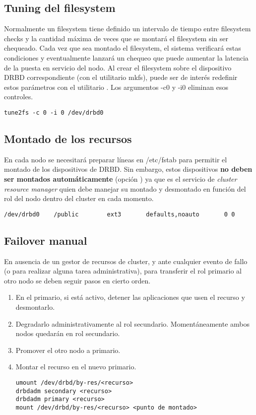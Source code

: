 \subsection{Tuning del filesystem}
Normalmente un filesystem tiene definido un intervalo de tiempo entre filesystem checks y la cantidad máxima de veces que se montará el filesystem sin ser chequeado. Cada vez que sea montado el filesystem, el sistema verificará estas condiciones y eventualmente lanzará un chequeo que puede aumentar la latencia de la puesta en servicio del nodo. Al crear el filesystem sobre el dispositivo DRBD correspondiente (con el utilitario mkfs), puede ser de interés redefinir estos parámetros con el utilitario . Los argumentos -c0 y -i0 eliminan esos controles. 

\begin{lstlisting}
tune2fs -c 0 -i 0 /dev/drbd0
\end{lstlisting}

\subsection{Montado de los recursos}
En cada nodo se necesitará preparar líneas en /etc/fstab para permitir el montado de los dispositivos de DRBD. Sin embargo, estos dispositivos \textbf{no deben ser montados automáticamente} (opción ) ya que es el servicio de \textit{cluster resource manager} quien debe manejar su montado y desmontado en función del rol del nodo dentro del cluster en cada momento.

\begin{lstlisting}
/dev/drbd0    /public        ext3       defaults,noauto       0 0
\end{lstlisting}

\subsection{Failover manual}
En ausencia de un gestor de recursos de cluster, y ante cualquier evento de fallo (o para realizar alguna tarea administrativa), para transferir el rol primario al otro nodo se deben seguir pasos en cierto orden. 

\begin{enumerate}
	\item En el primario, si está activo, detener las aplicaciones que usen el recurso y desmontarlo.
	\item Degradarlo administrativamente al rol secundario. Momentáneamente ambos nodos quedarán en rol secundario.
	\item Promover el otro nodo a primario.
	\item Montar el recurso en el nuevo primario.
	\begin{lstlisting}
umount /dev/drbd/by-res/<recurso>
drbdadm secondary <recurso>
drbdadm primary <recurso>
mount /dev/drbd/by-res/<recurso> <punto de montado>
\end{lstlisting}

\end{enumerate}


